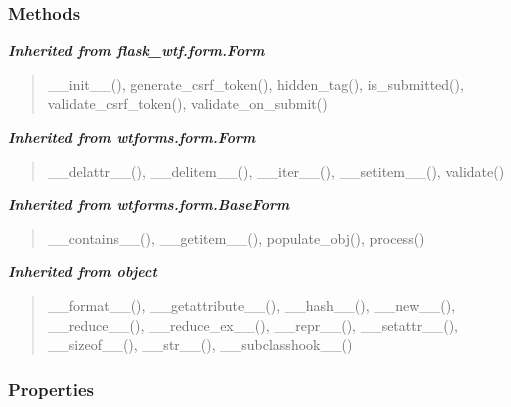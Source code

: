   \subsubsection{Methods}


\large{\textbf{\textit{Inherited from flask\_wtf.form.Form}}}

\begin{quote}
\_\_init\_\_(), generate\_csrf\_token(), hidden\_tag(), is\_submitted(), validate\_csrf\_token(), validate\_on\_submit()
\end{quote}

\large{\textbf{\textit{Inherited from wtforms.form.Form}}}

\begin{quote}
\_\_delattr\_\_(), \_\_delitem\_\_(), \_\_iter\_\_(), \_\_setitem\_\_(), validate()
\end{quote}

\large{\textbf{\textit{Inherited from wtforms.form.BaseForm}}}

\begin{quote}
\_\_contains\_\_(), \_\_getitem\_\_(), populate\_obj(), process()
\end{quote}

\large{\textbf{\textit{Inherited from object}}}

\begin{quote}
\_\_format\_\_(), \_\_getattribute\_\_(), \_\_hash\_\_(), \_\_new\_\_(), \_\_reduce\_\_(), \_\_reduce\_ex\_\_(), \_\_repr\_\_(), \_\_setattr\_\_(), \_\_sizeof\_\_(), \_\_str\_\_(), \_\_subclasshook\_\_()
\end{quote}


  \subsubsection{Properties}

